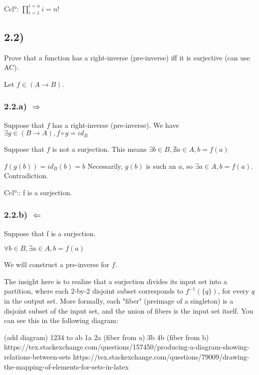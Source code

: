 \documentclass[12pt, letterpaper, twoside]{report}
\begin{document}
Ccl°: $\prod_{i=1}^{i=n} i = n!$



\subsection*{2.2)}

Prove that a function has a right-inverse (pre-inverse) iff it is surjective (can use AC).

Let $f \in (A \to B)$.

\subsubsection*{2.2.a) $\Rightarrow$}

Suppose that $f$ has a right-inverse (pre-inverse).
We have $\exists g \in (B \to A), f \circ g = id_B$

Suppose that $f$ is not a surjection. This means $\exists b \in B, \nexists a \in A, b = f(a)$

$f(g(b))= id_B (b) = b$ Necessarily, $g(b)$ is such an $a$, so $\exists a \in A, b = f(a)$. Contradiction.


Ccl°:: f is a surjection.


\subsubsection*{2.2.b) $\Leftarrow$}

Suppose that f is a surjection.

$\forall b \in B, \exists a \in A, b = f(a)$

We will construct a pre-inverse for $f$.

The insight here is to realize that a surjection divides its input set into a partition, where each 2-by-2 disjoint subset corresponds to $f^{-1}(\{q\})$, for every $q$ in the output set. More formally, each "fiber" (preimage of a singleton) is a disjoint subset of the input set, and the union of fibers is the input set itself. You can see this in the following diagram:

(add diagram)
1234 to ab
1a 2a (fiber from a)
3b 4b (fiber from b)
https://tex.stackexchange.com/questions/157450/producing-a-diagram-showing-relations-between-sets
https://tex.stackexchange.com/questions/79009/drawing-the-mapping-of-elements-for-sets-in-latex
\end{document}
